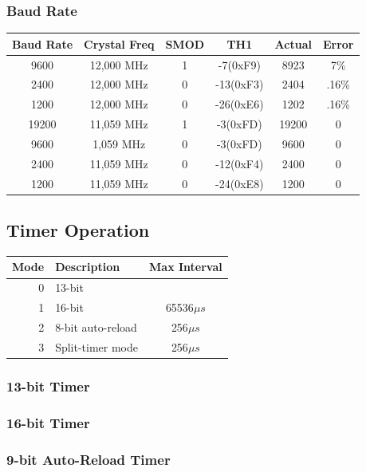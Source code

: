 \documentclass[journal]{IEEEtran}
\begin{document}
{\subsubsection{Baud Rate}
\begin{center}
	\begin{tabular}{c|c|c|c|c|c}
		Baud Rate & Crystal Freq & SMOD & TH1 & Actual & Error \\
		\hline
		9600 & 12,000 MHz & 1 & -7(0xF9) & 8923 & 7\%\\
		2400 & 12,000 MHz & 0 & -13(0xF3) & 2404 & .16\%\\
		1200 & 12,000 MHz & 0 & -26(0xE6) & 1202 & .16\%\\
		19200 & 11,059 MHz & 1 & -3(0xFD) & 19200 & 0 \\
		9600 & 1,059 MHz & 0 & -3(0xFD) & 9600 & 0 \\
		2400 & 11,059 MHz & 0 & -12(0xF4) & 2400 & 0 \\
		1200 & 11,059 MHz & 0 & -24(0xE8) & 1200 & 0 \\
	\end{tabular}
\end{center}

\subsection{Timer Operation}
\begin{center}
	\begin{tabular}{r|l c}
		Mode & Description & Max Interval\\
		\hline
		0 & 13-bit & \\
		1 & 16-bit & 65536$\mu s$\\
		2 & 8-bit auto-reload & 256$\mu s$ \\
		3 & Split-timer mode & 256$\mu s$\\
	\end{tabular}
\end{center}
\subsubsection{13-bit Timer}

\subsubsection{16-bit Timer}

\subsubsection{9-bit Auto-Reload Timer}

}
\end{document}
